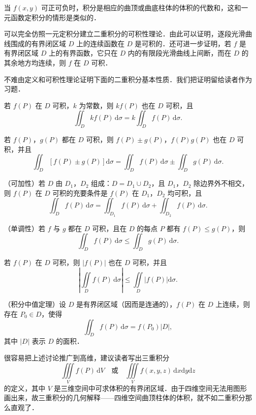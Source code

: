 当 $f(x,y)$ 可正可负时，积分是相应的曲顶或曲底柱体的体积的代数和，这和一元函数定积分的情形是类似的．

可以完全仿照一元定积分建立二重积分的可积性理论．由此可以证明，逐段光滑曲线围成的有界闭区域 $D$ 上的连续函数在 $D$ 是可积的．还可进一步证明，若 $f$ 是有界闭区域 $D$ 上的有界函数，它只在 $D$ 内的有限段光滑曲线上间断，而在 $D$ 的其余地方均连续，则 $f$ 在 $D$ 可积．

不难由定义和可积性理论证明下面的二重积分基本性质．我们把证明留给读者作为习题．

\begin{ziti}
\item 若 $f(P)$ 在 $D$ 可积，$k$ 为常数，则 $kf(P)$ 也在 $D$ 可积，且
\[
\iint_{D}kf(P)\,\mathrm{d}\sigma=k\iint_{D}f(P)\,\mathrm{d}\sigma.
\]
\item 若 $f(P)$，$g(P)$ 都在 $D$ 可积，则 $f(P)\pm g(P)$，$f(P)g(P)$ 也在 $D$ 可积，并且
\[
\iint_{D}\left[f(P)\pm g(P)\right]\mathrm{d}\sigma=\iint_{D}f(P)\,\mathrm{d}\sigma\pm\iint_{D}g(P)\,\mathrm{d}\sigma.
\]
\item （可加性）若 $D$ 由 $D_{1}$，$D_{2}$ 组成：$D=D_{1}\cup D_{2}$，且 $D_{1}$，$D_{2}$ 除边界外不相交，则 $f(P)$ 在 $D$ 可积的充要条件是 $f(P)$ 在 $D_{1}$，$D_{2}$ 均可积，且
\[
\iint_{D}f(P)\,\mathrm{d}\sigma=\iint_{D_{1}}f(P)\,\mathrm{d}\sigma+\iint_{D_{2}}f(P)\,\mathrm{d}\sigma.
\]
\item （单调性）若 $f$ 与 $g$ 都在 $D$ 可积，且在 $D$ 的每点 $P$ 都有 $f(P)\leqslant g(P)$，则
\[
\iint_{D}f(P)\,\mathrm{d}\sigma\leqslant\iint_{D}g(P)\,\mathrm{d}\sigma.
\]
\item 若 $f(P)$ 在 $D$ 可积，则 $\left|f(P)\right|$ 也在 $D$ 可积，并且
\[
\left|\iint\limits_{D}f(P)\,\mathrm{d}\sigma\right|\leqslant\iint\limits_{D}\left|f(P)\right|\mathrm{d}\sigma.
\]
\item （积分中值定理）设 $D$ 是有界闭区域（因而是连通的），$f(P)$ 在 $D$ 上连续，则存在 $P_{0}\in D$，使得
\[
\iint_{D}f(P)\,\mathrm{d}\sigma=f(P_{0})\left|D\right|,
\]
其中 $\left|D\right|$ 表示 $D$ 的面积．
\end{ziti}

很容易把上述讨论推广到高维，建议读者写出三重积分
\[
\iiint\limits_{V}f(P)\,\mathrm{d}V\quad\text{或}\quad\iiint\limits_{V}f(x,y,z)\,\mathrm{d}x\mathrm{d}y\mathrm{d}z
\]
的定义，其中 $V$ 是三维空间中可求体积的有界闭区域．由于四维空间无法用图形画出来，故三重积分的几何解释——四维空间曲顶柱体的体积，就不如二重积分那么直观了．

